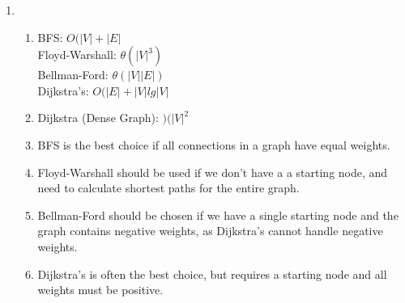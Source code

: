 \documentclass{article}
\begin{document}
\begin{enumerate}
\item 
    \begin{enumerate}[label=(\alph*)]
        \item
            BFS: \(O(|V| + |E|\)
            \\[\medskipamount]
            Floyd-Warshall: \(\theta(|V|^3)\)
            \\[\medskipamount]
            Bellman-Ford: \(\theta(|V||E|)\)
            \\[\medskipamount]
            Dijkstra's: \(O(|E| + |V|lg|V|\)
            
        \item
            Dijkstra (Dense Graph): \()(|V|^2\)
            
        \item
            BFS is the best choice if all connections in a graph have equal weights.
        
        \item
            Floyd-Warshall should be used if we don't have a a starting node, and need to calculate shortest paths for the entire graph.
            
        \item
            Bellman-Ford should be chosen if we have a single starting node and the graph contains negative weights, as Dijkstra's cannot handle negative weights.
            
        \item
            Dijkstra's is often the best choice, but requires a starting node and all weights must be positive.        
    \end{enumerate}
\end{enumerate}
\end{document}
